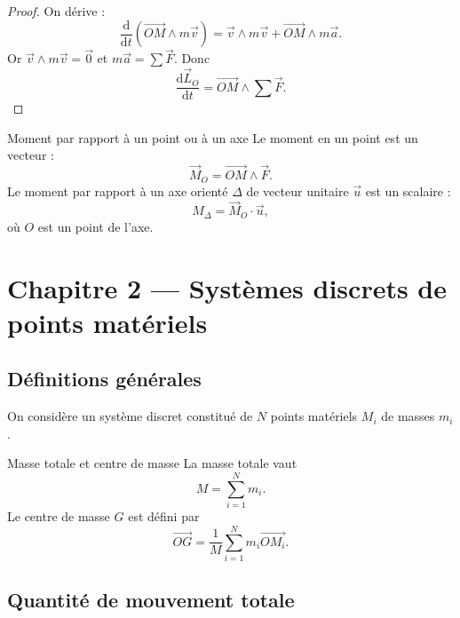 \documentclass[11pt,a4paper]{article}
\newcommand{\vect}[1]{\overrightarrow{#1}}
\newcommand{\der}[2]{\frac{\mathrm{d}#1}{\mathrm{d}#2}}
\begin{document}
\begin{proof}
On dérive :
\[
\der{}{t}(\vect{OM}\wedge m\vec v)
=
\vec v\wedge m\vec v+\vect{OM}\wedge m\vec a.
\]
Or $\vec v\wedge m\vec v=\vec 0$ et $m\vec a=\sum \vec F$.
Donc
\[
\der{\vec L_O}{t}=\vect{OM}\wedge\sum\vec F.
\]
\end{proof}

\begin{warningbox}{Moment par rapport à un point ou à un axe}{}
Le moment en un point est un vecteur :
\[
\vec M_O=\vect{OM}\wedge\vec F.
\]
Le moment par rapport à un axe orienté $\Delta$ de vecteur unitaire $\vec u$ est un scalaire :
\[
M_\Delta=\vec M_O\cdot\vec u,
\]
où $O$ est un point de l'axe.
\end{warningbox}

\section{Chapitre 2 — Systèmes discrets de points matériels}

\subsection{Définitions générales}

On considère un système discret constitué de $N$ points matériels $M_i$ de masses $m_i$.

\begin{definitionbox}{Masse totale et centre de masse}{}
La masse totale vaut
\[
M=\sum_{i=1}^N m_i.
\]
Le centre de masse $G$ est défini par
\[
\vect{OG}=\frac{1}{M}\sum_{i=1}^{N}m_i\vect{OM_i}.
\]
\end{definitionbox}

\begin{center}
\end{center}

\subsection{Quantité de mouvement totale}
\end{document}
